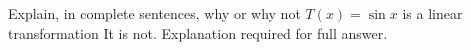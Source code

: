 {Explain, in complete sentences, why or why not $T(x) = \sin x$ is a linear transformation
}
{It is not. Explanation required for full answer.
}